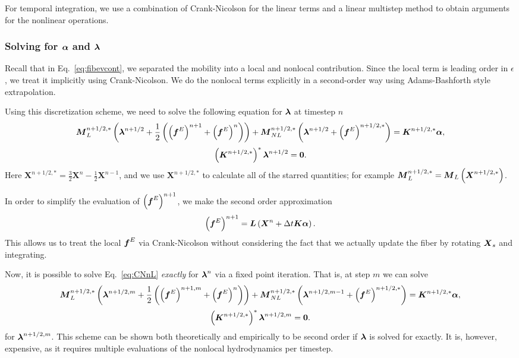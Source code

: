 For temporal integration, we use a combination of Crank-Nicolson for the linear terms and a linear multistep method to obtain arguments for the nonlinear operations. 

\subsubsection{Solving for $\boldsymbol{\alpha}$ and $\boldsymbol{\lambda}$}
Recall that in Eq.\ \eqref{eq:fibevcont}, we separated the mobility into a local and nonlocal contribution. Since the local term is leading order in $\epsilon$, we treat it implicitly using Crank-Nicolson. We do the nonlocal terms explicitly in a second-order way using Adams-Bashforth style extrapolation. 

Using this discretization scheme, we need to solve the following equation for $\boldsymbol{\lambda}$ at timestep $n$ 
\begin{gather}
\label{eq:CNnL}
\boldsymbol{M}_L^{n+1/2,*} \left(\boldsymbol{\lambda}^{n+1/2}+\frac{1}{2}\left(\left(\boldsymbol{f}^E\right)^{n+1}+\left(\boldsymbol{f}^E\right)^{n}\right)\right)+\boldsymbol{M}_{NL}^{n+1/2,*} \left( \boldsymbol{\lambda}^{n+1/2}+\left(\boldsymbol{f}^E\right)^{n+1/2,*}\right) = \boldsymbol{K}^{n+1/2,*}\boldsymbol{\alpha},\\[2 pt]
\nonumber
\left(\boldsymbol{K}^{n+1/2,*}\right)^*\boldsymbol{\lambda}^{n+1/2} = \boldsymbol{0}. 
\end{gather}
Here $\bm{X}^{n+1/2,*}=\frac{3}{2}\bm{X}^n-\frac{1}{2}\bm{X}^{n-1}$, and we use $\bm{X}^{n+1/2,*}$ to calculate all of the starred quantities; for example $\boldsymbol{M}_{L}^{n+1/2,*}=\boldsymbol{M}_L\left(\boldsymbol{X}^{n+1/2,*}\right)$. 

In order to simplify the evaluation of $\left(\boldsymbol{f}^E\right)^{n+1}$, we make the second order approximation 
\begin{equation}
\left(\boldsymbol{f}^E\right)^{n+1}=\boldsymbol{L}\left(\boldsymbol{X}^n+\Delta t \boldsymbol{K}\boldsymbol{\alpha}\right). 
\end{equation}
This allows us to treat the local $\boldsymbol{f}^E$ via Crank-Nicolson without considering the fact that we actually update the fiber by rotating $\boldsymbol{X}_s$ and integrating. 

Now, it is possible to solve Eq.\ \eqref{eq:CNnL} \textit{exactly} for $\boldsymbol{\lambda}^{n}$ via a fixed point iteration. That is, at step $m$ we can solve
\begin{gather}
\label{eq:CNnLFP}
\boldsymbol{M}_L^{n+1/2,*} \left(\boldsymbol{\lambda}^{n+1/2, m}+\frac{1}{2}\left(\left(\boldsymbol{f}^E\right)^{n+1, m}+\left(\boldsymbol{f}^E\right)^{n}\right)\right)+\boldsymbol{M}_{NL}^{n+1/2,*} \left( \boldsymbol{\lambda}^{n+1/2, m-1}+\left(\boldsymbol{f}^E\right)^{n+1/2,*}\right) = \boldsymbol{K}^{n+1/2,*}\boldsymbol{\alpha},\\[2 pt]
\nonumber
\left(\boldsymbol{K}^{n+1/2,*}\right)^*\boldsymbol{\lambda}^{n+1/2, m} = \boldsymbol{0}. 
\end{gather}
for $\boldsymbol{\lambda}^{n+1/2, m}$. This scheme can be shown both theoretically and empirically to be second order if $\boldsymbol{\lambda}$ is solved for exactly. It is, however, expensive, as it requires multiple evaluations of the nonlocal hydrodynamics per timestep. 

